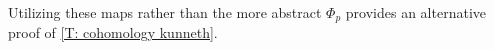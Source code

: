 Utilizing these maps rather than the more abstract $\Phi_p$ provides an alternative proof of \cref{T: cohomology kunneth}.

\begin{comment}

	Dev's sketched elementary proof:

	Use pullback of cross product after showing that cross product agrees with singular cross product using the cubical structure as intermediary as in flows.
	In particular, given $V$ and $W$ then $V \times W = (V \times M) \cap (M \times V)$ should act on the cube $\sigma \times \tau$ as $W(\sigma)V(\tau)$.

	\begin{definition}
		Suppose $M$ and $N$ are manifolds.
		Then there is a product map $C^*_\Gamma(M) \otimes C^*_\Gamma(N) \to C^*_\Gamma(M \times N)$ that takes geometric cochains $\uW \in C^*_\Gamma(M)$ and $\uV \in C^*_\Gamma(N)$ represented by $r_W \colon W \to M$ and $r_V \colon V \to N$ to the cochain $\uW \times \uV$ represented by $r_W \times r_V \colon W \times V \to M \times N$ with the product co-orientation.
		In other words, if $(\beta_W,\beta_M)$ and $(\beta_V,\beta_N)$ are the corresponding co-orientations of $\uW$ and $\uV$, then the product co-orientation is $(\beta_W \wedge \beta_V,\beta_M \wedge \beta_N)$.
		By linear extension we obtain the \textbf{(external) cross product} map $C^*_\Gamma(M) \otimes C^*_\Gamma(N) \to C^*_\Gamma(M \times N)$.
	\end{definition}

	\begin{lemma}
		The cochain cross product is a well-defined map.
	\end{lemma}

	\begin{proof}
		If $V$ is trivial via $\rho_W \colon W \to W$, then $W \times V$ is trivial via $\rho_W \times \id_V$.
		Similarly, if $W$ is of small rank then so is $W \times V$.
		Since the sum of geometric cochains is represented by disjoint union, we have $(W_1\pm W_2) \times V = (W_1 \times V)\pm (W_2 \times V)$.
		So if $W_1-W_2 \in Q^*(M)$ then $W_1 \times V- W_2 \times V = (W_1-W_2) \times V \in Q^*(M \times N)$.
		So the cross product is independent of representative for $\uW$, and similarly it is independent of the choice of representative for $\uV$.

		To see that we have a chain map, we observe that \red{PUT SOMETHING IN THE CO-ORIENTATION SECTION}.
	\end{proof}


\end{comment}
